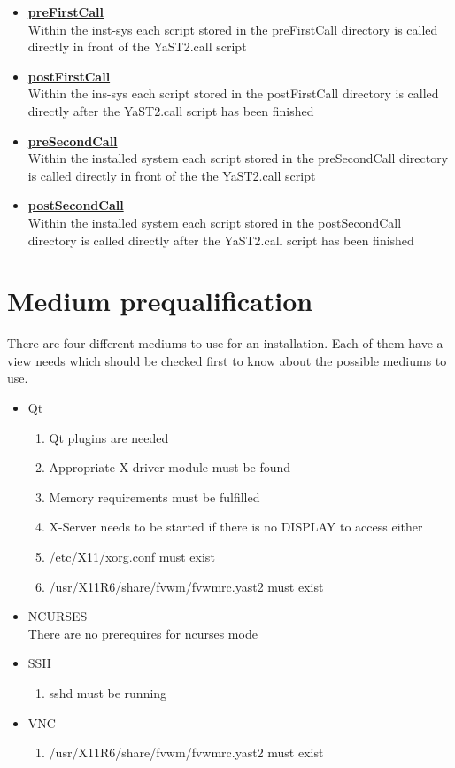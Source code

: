\begin{itemize}
\item \textbf{\underline{preFirstCall}}\\
	Within the inst-sys each script stored in the preFirstCall directory is
	called directly in front of the YaST2.call script
\item \textbf{\underline{postFirstCall}}\\
	Within the ins-sys each script stored in the postFirstCall directory is
	called directly after the YaST2.call script has been finished
\item \textbf{\underline{preSecondCall}}\\
	Within the installed system each script stored in the preSecondCall
	directory is called directly in front of the the YaST2.call script
\item \textbf{\underline{postSecondCall}}\\
	Within the installed system each script stored in the postSecondCall
	directory is called directly after the YaST2.call script has been
	finished
\end{itemize}

\section{Medium prequalification}
There are four different mediums to use for an installation. Each
of them have a view needs which should be checked first to know
about the possible mediums to use.

\begin{itemize}
\item Qt
	\begin{enumerate}
	\item Qt plugins are needed
	\item Appropriate X driver module must be found
	\item Memory requirements must be fulfilled
	\item X-Server needs to be started if there is no DISPLAY to access either
	\item /etc/X11/xorg.conf must exist
	\item /usr/X11R6/share/fvwm/fvwmrc.yast2 must exist
	\end{enumerate}
\item NCURSES\\
	There are no prerequires for ncurses mode
\item SSH
	\begin{enumerate}
	\item sshd must be running
	\end{enumerate}
\item VNC
	\begin{enumerate}
	\item /usr/X11R6/share/fvwm/fvwmrc.yast2 must exist
	\end{enumerate}
\end{itemize}


